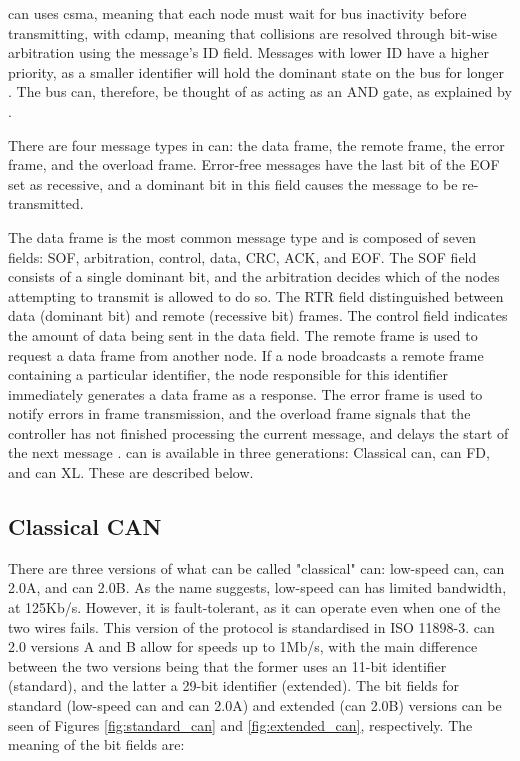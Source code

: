 \gls{can} uses \gls{csma}, meaning that each node must wait for bus inactivity before transmitting, with \gls{cdamp}, meaning that collisions are resolved through bit-wise arbitration using the message's ID field. Messages with lower ID have a higher priority, as a smaller identifier will hold the dominant state on the bus for longer \citep{Corrigan2002}. The bus can, therefore, be thought of as acting as an AND gate, as explained by \cite{Cook2008}.\par
There are four message types in \gls{can}: the data frame, the remote frame, the error frame, and the overload frame. Error-free messages have the last bit of the EOF set as recessive, and a dominant bit in this field causes the message to be re-transmitted.\par
The data frame is the most common message type and is composed of seven fields: SOF, arbitration, control, data, CRC, ACK, and EOF. The SOF field consists of a single dominant bit, and the arbitration decides which of the nodes attempting to transmit is allowed to do so. The RTR field distinguished between data (dominant bit) and remote (recessive bit) frames. The control field indicates the amount of data being sent in the data field. The remote frame is used to request a data frame from another node. If a node broadcasts a remote frame containing a particular identifier, the node responsible for this identifier immediately generates a data frame as a response. The error frame is used to notify errors in frame transmission, and the overload frame signals that the controller has not finished processing the current message, and delays the start of the next message \citep{lee2017otids}.
\gls{can} is available in three generations: Classical \gls{can}, \gls{can} FD, and \gls{can} XL. These are described below.

\subsection{Classical CAN}

There are three versions of what can be called "classical" \gls{can}: low-speed \gls{can}, \gls{can} 2.0A, and \gls{can} 2.0B. As the name suggests, low-speed \gls{can} has limited bandwidth, at 125Kb/s. However, it is fault-tolerant, as it can operate even when one of the two wires fails. This version of the protocol is standardised in ISO 11898-3. \gls{can} 2.0 versions A and B allow for speeds up to 1Mb/s, with the main difference between the two versions being that the former uses an 11-bit identifier (standard), and the latter a 29-bit identifier (extended). The bit fields for standard (low-speed \gls{can} and \gls{can} 2.0A) and extended (\gls{can} 2.0B) versions can be seen of Figures \ref{fig:standard_can} and \ref{fig:extended_can}, respectively. The meaning of the bit fields are:

